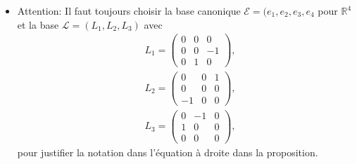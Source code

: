 \documentclass[12pt,a4paper]{article}
\theoremstyle{plain}
\theoremstyle{plain}
\theoremstyle{plain}
\theoremstyle{definition}
\theoremstyle{definition}
\theoremstyle{definition}
\theoremstyle{plain}
\newcommand{\R}{\mathbb{R}}
\begin{document}
\begin{itemize}
\item Attention: Il faut toujours choisir la base canonique $\mathcal{E} = (e_1, e_2,e_3, e_4$ pour $\R^4$ et la base $\mathcal{L} = (L_1, L_2, L_3)$ avec
\begin{align}
\label{eq: L1}
	&L_1 = \left(\begin{array}{ccc}
	0 & 0 & 0 \\ 
	0 & 0 & -1 \\ 
	0 & 1 & 0
	\end{array}  \right ),\\
\label{eq: L2}
	&L_2  = \left (\begin{array}{ccc}
	0 & 0 & 1 \\ 
	0 & 0 & 0 \\ 
	-1 & 0 & 0
	\end{array}  \right ),\\
\label{eq: L3}
	&L_3  = \left (\begin{array}{ccc}
	0 & -1 & 0 \\ 
	1 & 0 & 0 \\ 
	0 & 0 & 0
	\end{array}  \right ),
\end{align}
pour justifier la notation dans l'équation à droite dans la proposition.
\end{itemize}
\end{document}
